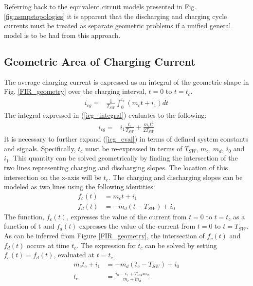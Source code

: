 \documentclass[conference]{IEEEtran}
\begin{document}
Referring back to the equivalent circuit models presented in Fig. \ref{fig:asmpstopologies} it is apparent that the discharging and charging cycle currents must be treated as separate geometric problems if a unified general model is to be had from this approach.

\subsection{Geometric Area of Charging Current}
The average charging current is expressed as an integral of the geometric shape in Fig. \ref{FIR_geometry} over the charging interval, $t=0$ to $t=t_c$.
\begin{align}
i_{cg} = & \frac{1}{T_{SW}}\int_0^{t_c}(m_ct+i_1)dt \label{icg_integral}
\end{align}
The integral expressed in (\ref{icg_integral}) evaluates to the following:
\begin{align}
i_{cg} = & i_1\frac{t_c}{T_{SW}}+\frac{m_ct_c^2}{2T_{SW}} \label{icg_eval}
\end{align}
It is necessary to further expand (\ref{icg_eval}) in terms of defined system constants and signals.  Specifically, \(t_c\) must be re-expressed in terms of $T_{SW}$, $m_c$, $m_d$, $i_0$ and $i_1$. This quantity can be solved geometrically by finding the intersection of the two lines representing charging and discharging slopes. The location of this intersection on the x-axis will be \(t_c\). The charging and discharging slopes can be modeled as two lines using the following identities:
\begin{align}
f_c(t) & = m_ct+i_1\\
f_d(t) & = -m_d(t-T_{SW})+i_0
\end{align}
The function, \(f_c(t)\), expresses the value of the current from \(t = 0\) to \(t = t_c\) as a function of t and \(f_d(t)\) expresses the value of the current from \(t = 0\) to \(t = T_{SW}\). As can be inferred from Figure \ref{FIR_geometry}, the intersection of $f_c(t)$ and $f_d(t)$ occurs at time \(t_c\). The expression for $t_c$ can be solved by setting $f_c(t) = f_d(t)$, evaluated at $t=t_c$.
\begin{align}
m_ct_c+i_1 & = -m_d(t_c-T_{SW})+i_0\\
t_c & = \frac{i_0-i_1+T_{SW}m_d}{m_c+m_d} \label{tcharge}
\end{align}
\end{document}
